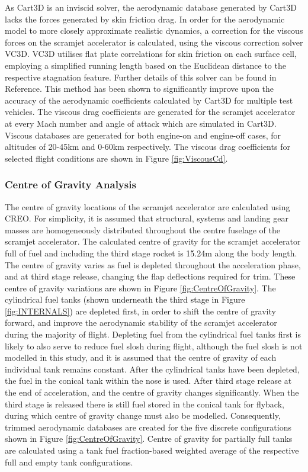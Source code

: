 		As Cart3D is an inviscid solver, the aerodynamic database generated by Cart3D lacks the forces generated by skin friction drag. In order for the aerodynamic model to more closely approximate realistic dynamics, a correction for the viscous forces on the scramjet accelerator is calculated, using the viscous correction solver VC3D\cite{Ward2018}. VC3D utilises flat plate correlations for skin friction on each surface cell, employing a simplified running length based on the Euclidean distance to the respective stagnation feature. Further details of this solver can be found in Reference\cite{Ward2018}. This method has been shown to significantly improve upon the accuracy of the aerodynamic coefficients calculated by Cart3D for multiple test vehicles\cite{Ward2018}. The viscous drag coefficients are generated for the scramjet accelerator at every Mach number and angle of attack which are simulated in Cart3D. Viscous databases are generated for both engine-on and engine-off cases, for altitudes of 20-45km and 0-60km respectively.  The viscous drag coefficients for selected flight conditions are shown in Figure \ref{fig:ViscousCd}.
		
		
		
		
		\subsubsection{Centre of Gravity Analysis}
		The centre of gravity locations of the scramjet accelerator are calculated using CREO. For simplicity, it is assumed that structural, systems and landing gear masses are homogeneously distributed throughout the centre fuselage of the scramjet accelerator. 
		The calculated centre of gravity for the scramjet accelerator full of fuel and including the third stage rocket is \textcolor{black}{15.24m} along the body length. The centre of gravity varies as fuel is depleted throughout the acceleration phase, and at third stage release, changing the flap deflections required for trim. \textcolor{black}{These centre of gravity variations are shown in Figure \ref{fig:CentreOfGravity}}. The cylindrical fuel tanks \textcolor{black}{(shown underneath the third stage in Figure \ref{fig:INTERNALS})} are depleted first, in order to shift the centre of gravity forward, and improve the aerodynamic stability of the scramjet accelerator during the majority of flight. Depleting fuel from the cylindrical fuel tanks first is likely to also serve to reduce fuel slosh during flight, although the fuel slosh is not modelled in this study, and it is assumed that the centre of gravity of each individual tank remains constant. After the cylindrical tanks have been depleted, the fuel in the conical tank within the nose is used. After third stage release at the end of acceleration, and the centre of gravity changes significantly. When the third stage is released there is still fuel stored in the conical tank for flyback, during which centre of gravity change must also be modelled. 
		Consequently, trimmed aerodynamic databases are created for the five discrete configurations shown in Figure \ref{fig:CentreOfGravity}. Centre of gravity for partially full tanks are calculated using a tank fuel fraction-based weighted average of the respective full and empty tank configurations. 
		
